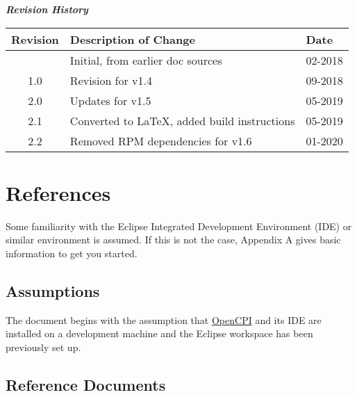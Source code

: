 \begin{center}
  \textit{\textbf{Revision History}}
  \begin{table}[H]
    \begin{tabularx}{\textwidth}{|c|X|l|}
      \hline
      \rowcolor{blue}
      \textbf{Revision} & \textbf{Description of Change} & \textbf{Date} \\
      \hline
       & Initial, from earlier doc sources & 02-2018 \\
      \hline
      1.0 & Revision for v1.4& 09-2018 \\
      \hline
      2.0 & Updates for v1.5 & 05-2019 \\
      \hline
      2.1 & Converted to \LaTeX, added build instructions & 05-2019 \\
      \hline
      2.2 & Removed RPM dependencies for v1.6 & 01-2020 \\
      \hline
    \end{tabularx}
  \end{table}
\end{center}
\newpage

\setcounter{tocdepth}{2}
\tableofcontents
{}
\newpage
\listoftables
\listoffigures
\newpage
{}
\section{References}
Some familiarity with the Eclipse Integrated Development Environment (IDE) or similar environment is assumed. If this is not the case, Appendix A gives basic information to get you started.

\subsection{Assumptions}
The document begins with the assumption that \href{https://gitlab.com/opencpi/opencpi}{OpenCPI} and its IDE are installed on a development machine and the Eclipse workspace has been previously set up.
\subsection{Reference Documents}
\def\myreferences{
\hline
OpenCPI Website &
\href{https://www.opencpi.org}{www.opencpi.org} \\
\hline
OpenCPI Component Development Guide &
\githubio{OpenCPI\_Component\_Development\_Guide.pdf} \\
\hline
OpenCPI Application Development Guide &
\githubio{OpenCPI\_Application\_Development\_Guide.pdf} \\
}

